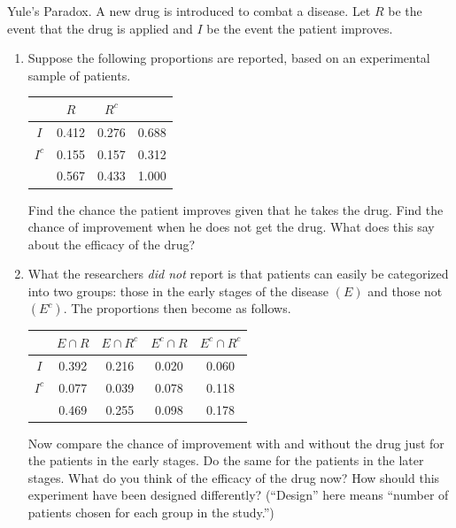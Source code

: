 \documentclass[12pt]{article}
\newenvironment{problem}[2][Problem]{\begin{trivlist}
\item[\hskip \labelsep {\bfseries #1}\hskip \labelsep {\bfseries #2.}]}
{\end{trivlist}}
\begin{document}
\begin{problem}{3}
  Yule's Paradox. A new drug is introduced to combat a disease. Let $R$ be
  the event that the drug is applied and $I$ be the event the patient improves.
  \begin{enumerate}
    \item Suppose the following proportions are reported, based on an
    experimental sample of patients.
    \begin{center}
      \begin{tabular}{|c|c c|c|}
        \hline
        & $R$ & $R^c$ &  \\
        \hline
        $I$ & 0.412 & 0.276 & 0.688 \\
        $I^c$ & 0.155 & 0.157 & 0.312 \\
        \hline
        & 0.567 & 0.433 & 1.000 \\
        \hline
      \end{tabular}
    \end{center}
    Find the chance the patient improves given that he takes the drug. Find
    the chance of improvement when he does not get the drug. What does this
    say about the efficacy of the drug?
    \item What the researchers \textit{did not} report is that patients
    can easily be categorized into two groups: those in the early stages of
    the disease $(E)$ and those not $(E^c)$. The proportions then become
    as follows.
    \begin{center}
      \begin{tabular}{|c|c c c c|}
        \hline
        & $E \cap R$ & $E \cap R^c$ & $E^c \cap R$ & $E^c \cap R^c$  \\
        \hline
        $I$ & 0.392 & 0.216 & 0.020 & 0.060 \\
        $I^c$ & 0.077 & 0.039 & 0.078 & 0.118 \\
        \hline
        & 0.469 & 0.255 & 0.098 & 0.178 \\
        \hline
      \end{tabular}
    \end{center}
    Now compare the chance of improvement with and without the drug just
    for the patients in the early stages. Do the same for the patients in
    the later stages. What do you think of the efficacy of the drug now?
    How should this experiment have been designed differently?
    (``Design'' here means ``number of patients chosen for each group
    in the study.'')
  \end{enumerate}

\end{problem}
\end{document}
